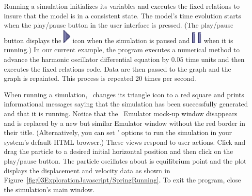 Running a simulation initializes its variables and executes the fixed relations to insure that the model is in a consistent state.  The model's time evolution starts when the play/pause button in the user interface is pressed. (The play/pause button displays the \includegraphics[scale=\linescale]{../_common/icons_png/play.png} icon when the simulation is paused and \includegraphics[scale=\linescale]{../_common/icons_png/pause.png} when it is running.) In our current example, the program executes a numerical method to advance the harmonic oscillator differential equation by $0.05$ time units and then executes the fixed relations code.  Data are then passed to the graph and the graph is repainted. This process is repeated $20$ times per second.

When running a simulation, \ejs\ changes its  triangle icon to a red  square and prints informational messages saying that the
simulation has been successfully generated and that it is running. Notice that the \ejs\ Emulator mock-up window disappears and is 
replaced by a new but similar Emulator window without the red border in their title. (Alternatively, you can set \ejs' options to run the simulation in your system's default HTML browser.) These views respond to user
actions. Click and drag the particle to a desired initial horizontal position and then click on the play/pause button.
The particle oscillates about is equilibrium point and the plot displays the displacement and velocity data as shown in
Figure~\ref{fig:03ExplorationJavascript/SpringRunning}.
To exit the program, close the simulation's main window.



